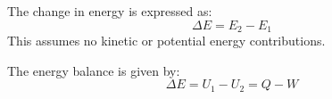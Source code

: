 The change in energy is expressed as:  
\[
\Delta E = E_2 - E_1
\]  
This assumes no kinetic or potential energy contributions.  

The energy balance is given by:  
\[
\Delta E = U_1 - U_2 = Q - W
\]